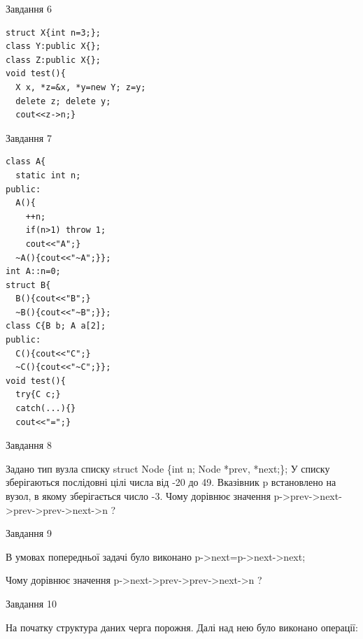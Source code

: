 \documentclass[12pt, ukrainian]{article}
\begin{document}
{{{{{{{{{{{{{\begin{minipage}[t]{7cm}
               
{\begin{center}Завдання {6}\end{center}}
\vspace{-6mm}

\begin{verbatim}
struct X{int n=3;};
class Y:public X{};
class Z:public X{};
void test(){
  X x, *z=&x, *y=new Y; z=y;
  delete z; delete y;
  cout<<z->n;}
\end{verbatim}            


               
{\begin{center}Завдання {7}\end{center}}
\vspace{-6mm}

\begin{verbatim}
class A{
  static int n; 
public:
  A(){
    ++n; 
    if(n>1) throw 1;
    cout<<"A";}
  ~A(){cout<<"~A";}};
int A::n=0;
struct B{
  B(){cout<<"B";}
  ~B(){cout<<"~B";}};
class C{B b; A a[2];
public:
  C(){cout<<"C";}
  ~C(){cout<<"~C";}};
void test(){
  try{C c;} 
  catch(...){} 
  cout<<"=";}
\end{verbatim}            


\end{minipage}
               
{\begin{center}Завдання {8}\end{center}}
\vspace{-6mm}
Задано тип вузла списку
struct Node \{int n; Node *prev, *next;\};
У списку зберігаються послідовні цілі числа від -20 до 49. Вказівник p встановлено на вузол, в якому зберігається число -3.
Чому дорівнює значення p->prev->next->prev->prev->next->n ?\par

               
{\begin{center}Завдання {9}\end{center}}
\vspace{-6mm}
В умовах попередньої задачі було виконано p->next=p->next->next;

Чому дорівнює значення p->next->prev->prev->next->n ?\par

\newpage
               
{\begin{center}Завдання {10}\end{center}}
\vspace{-6mm}
На початку структура даних черга порожня. Далі над нею було виконано операції:

}}}}}}}}}}}}}
\end{document}
